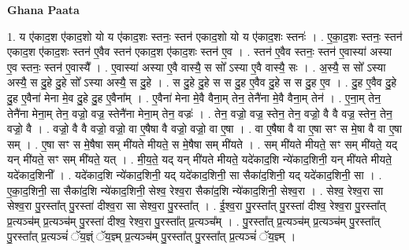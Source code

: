 \documentclass[17pt]{extarticle}
\begin{document}
\textbf{Ghana Paata } \newline

1. य ए॑काद॒श ए॑काद॒शो यो य ए॑काद॒शः स्तनः॒ स्तन॑ एकाद॒शो यो य ए॑काद॒शः स्तनः॑ । . ए॒का॒द॒शः स्तनः॒ स्तन॑ एकाद॒श ए॑काद॒शः स्तन॑ ए॒वैव स्तन॑ एकाद॒श ए॑काद॒शः स्तन॑ ए॒व । . स्तन॑ ए॒वैव स्तनः॒ स्तन॑ ए॒वास्या॑ अस्या ए॒व स्तनः॒ स्तन॑ ए॒वास्यै᳚ । . ए॒वास्या॑ अस्या ए॒वै वास्यै॒ स सो᳚ ऽस्या ए॒वै वास्यै॒ सः । . अ॒स्यै॒ स सो᳚ ऽस्या अस्यै॒ स दु॒हे दु॒हे सो᳚ ऽस्या अस्यै॒ स दु॒हे । . स दु॒हे दु॒हे स स दु॒ह ए॒वैव दु॒हे स स दु॒ह ए॒व । . दु॒ह ए॒वैव दु॒हे दु॒ह ए॒वैना॑ मेना मे॒व दु॒हे दु॒ह ए॒वैना᳚म् । . ए॒वैना॑ मेना मे॒वै वैना॒म् तेन॒ तेनै॑ना मे॒वै वैना॒म् तेन॑ । . ए॒ना॒म् तेन॒ तेनै॑ना मेना॒म् तेन॒ वज्रो॒ वज्र॒ स्तेनै॑ना मेना॒म् तेन॒ वज्रः॑ । . तेन॒ वज्रो॒ वज्र॒ स्तेन॒ तेन॒ वज्रो॒ वै वै वज्र॒ स्तेन॒ तेन॒ वज्रो॒ वै । . वज्रो॒ वै वै वज्रो॒ वज्रो॒ वा ए॒षैषा वै वज्रो॒ वज्रो॒ वा ए॒षा । . वा ए॒षैषा वै वा ए॒षा सꣳ स मे॒षा वै वा ए॒षा सम् । . ए॒षा सꣳ स मे॒षैषा सम् मी॑यते मीयते॒ स मे॒षैषा सम् मी॑यते । . सम् मी॑यते मीयते॒ सꣳ सम् मी॑यते॒ यद् यन् मी॑यते॒ सꣳ सम् मी॑यते॒ यत् । . मी॒य॒ते॒ यद् यन् मी॑यते मीयते॒ यदे॑काद॒शि न्ये॑काद॒शिनी॒ यन् मी॑यते मीयते॒ यदे॑काद॒शिनी᳚ । . यदे॑काद॒शि न्ये॑काद॒शिनी॒ यद् यदे॑काद॒शिनी॒ सा सैका॑द॒शिनी॒ यद् यदे॑काद॒शिनी॒ सा । . ए॒का॒द॒शिनी॒ सा सैका॑द॒शि न्ये॑काद॒शिनी॒ सेश्व॒ रेश्व॒रा सैका॑द॒शि न्ये॑काद॒शिनी॒ सेश्व॒रा । . सेश्व॒ रेश्व॒रा सा सेश्व॒रा पु॒रस्ता᳚त् पु॒रस्ता॑ दीश्व॒रा सा सेश्व॒रा पु॒रस्ता᳚त् । . ई॒श्व॒रा पु॒रस्ता᳚त् पु॒रस्ता॑ दीश्व॒ रेश्व॒रा पु॒रस्ता᳚त् प्र॒त्यञ्च॑म् प्र॒त्यञ्च॑म् पु॒रस्ता॑ दीश्व॒ रेश्व॒रा पु॒रस्ता᳚त् प्र॒त्यञ्च᳚म् । . पु॒रस्ता᳚त् प्र॒त्यञ्च॑म् प्र॒त्यञ्च॑म् पु॒रस्ता᳚त् पु॒रस्ता᳚त् प्र॒त्यञ्चं॑ ॅय॒ज्ञ्ं ॅय॒ज्ञ्म् प्र॒त्यञ्च॑म् पु॒रस्ता᳚त् पु॒रस्ता᳚त् प्र॒त्यञ्चं॑ ॅय॒ज्ञ्म् । \newline
\end{document}
